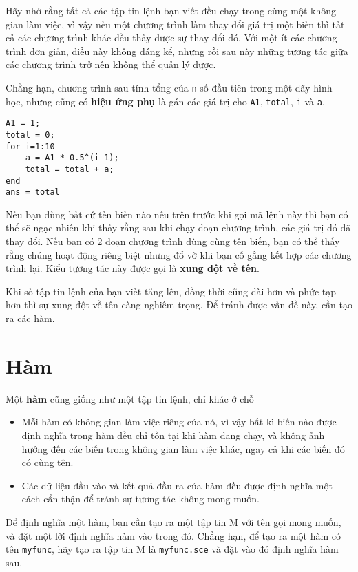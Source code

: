 \documentclass[12pt]{book}
\begin{document}
Hãy nhớ rằng tất cả các tập tin lệnh bạn viết đều chạy trong cùng
một không gian làm việc, vì vậy nếu một chương trình làm thay đổi 
giá trị một biến thì tất cả các chương trình khác đều thấy được
sự thay đổi đó. Với một ít các chương trình đơn giản, điều này
không đáng kể, nhưng rồi sau này những tương tác giữa các chương
trình trở nên không thể quản lý được.

Chẳng hạn, chương trình sau tính tổng của {\tt n} số đầu tiên
trong một dãy hình học, nhưng cũng có {\bf hiệu ứng phụ} là 
gán các giá trị cho {\tt A1}, {\tt total}, {\tt i} và {\tt a}.

\begin{verbatim}
A1 = 1;
total = 0;
for i=1:10
    a = A1 * 0.5^(i-1);
    total = total + a;
end
ans = total
\end{verbatim}

Nếu bạn dùng bất cứ tến biến nào nêu trên trước khi gọi mã lệnh này
thì bạn có thể sẽ ngạc nhiên khi thấy rằng sau khi chạy đoạn 
chương trình, các giá trị đó đã thay đổi. Nếu bạn có 2 đoạn chương
trình dùng cùng tên biến, bạn có thể thấy rằng chúng hoạt động
riêng biệt nhưng đổ vỡ khi bạn cố gắng kết hợp các chương trình lại.
Kiểu tương tác này được gọi là {\bf xung đột về tên}.

Khi số tập tin lệnh của bạn viết tăng lên, đồng thời cũng dài hơn
và phức tạp hơn thì sự xung đột về tên càng nghiêm trọng. Để tránh
được vấn đề này, cần tạo ra các hàm.


\section{Hàm}
\label{functions}

Một {\bf hàm} cũng giống như một tập tin lệnh, chỉ khác ở chỗ

\begin{itemize}

\item Mỗi hàm có không gian làm việc riêng của nó, vì vậy bất kì
biến nào được định nghĩa trong hàm đều chỉ tồn tại khi hàm đang
chạy, và không ảnh hưởng đến các biến trong không gian làm việc khác,
ngay cả khi các biến đó có cùng tên.

\item Các dữ liệu đầu vào và kết quả đầu ra của hàm đều được định
nghĩa một cách cẩn thận để tránh sự tương tác không mong muốn.

\end{itemize}

Để định nghĩa một hàm, bạn cần tạo ra một tập tin M với tên gọi
mong muốn, và đặt một lời định nghĩa hàm vào trong đó. Chẳng hạn, để
tạo ra một hàm có tên {\tt myfunc}, hãy tạo ra tập tin M là {\tt myfunc.sce}
và đặt vào đó định nghĩa hàm sau.
\end{document}
